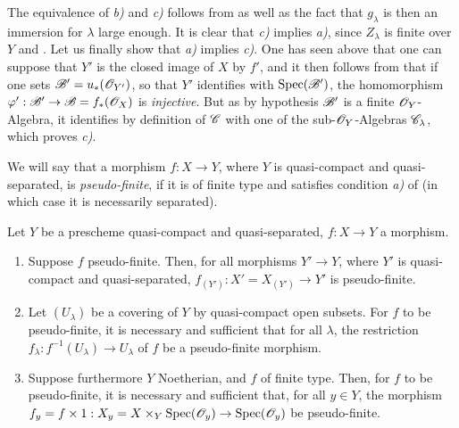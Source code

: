 The equivalence of \emph{b)} and \emph{c)} follows from  as well as the fact that $g_\lambda$ is then an immersion for $\lambda$ large enough.
It is clear that \emph{c)} implies \emph{a)}, since $Z_\lambda$ is finite over $Y$  and .
Let us finally show that \emph{a)} implies \emph{c)}.
One has seen above that one can suppose that $Y'$ is the closed image of $X$ by $f'$, and it then follows from  that if one sets $\mathscr{B}'=u_*(\mathscr{O}_{Y'})$, so that $Y'$ identifies with $\operatorname{Spec}(\mathscr{B}')$, the homomorphism $\varphi':\mathscr{B}'\to\mathscr{B}=f_*(\mathscr{O}_X)$ is \emph{injective}.
But as by hypothesis $\mathscr{B}'$ is a finite $\mathscr{O}_Y$-Algebra, it identifies by definition of $\mathscr{C}$ with one of the sub-$\mathscr{O}_Y$-Algebras $\mathscr{C}_\lambda$, which proves \emph{c)}.

We will say that a morphism $f:X\to Y$, where $Y$ is quasi-compact and quasi-separated, is \emph{pseudo-finite}, if it is of finite type and satisfies condition \emph{a)} of  (in which case it is necessarily separated).

\begin{corollary}[8.12.4]
\label{IV.8.12.4}
Let $Y$ be a prescheme quasi-compact and quasi-separated, $f:X\to Y$ a morphism.
\begin{enumerate}[label=\textup{(\roman*)}]
  \item Suppose $f$ pseudo-finite.
Then, for all morphisms $Y'\to Y$, where $Y'$ is quasi-compact and quasi-separated, $f_{(Y')}:X'=X_{(Y')}\to Y'$ is pseudo-finite.
  \item Let $(U_\lambda)$ be a covering of $Y$ by quasi-compact open subsets.
For $f$ to be pseudo-finite, it is necessary and sufficient that for all $\lambda$, the restriction $f_\lambda:f^{-1}(U_\lambda)\to U_\lambda$ of $f$ be a pseudo-finite morphism.
  \item Suppose furthermore $Y$ Noetherian, and $f$ of finite type.
Then, for $f$ to be pseudo-finite, it is necessary and sufficient that, for all $y\in Y$, the morphism $f_y=f\times 1:X_y=X\times_Y\operatorname{Spec}(\mathscr{O}_y)\to\operatorname{Spec}(\mathscr{O}_y)$ be pseudo-finite.
\end{enumerate}
\end{corollary}


